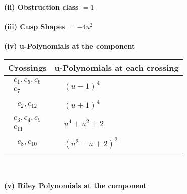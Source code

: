 \documentclass[1p]{elsarticle_modified}
\theoremstyle{definition}
\begin{document}
\flushleft \textbf{(ii) Obstruction class $= 1$}\\~\\
\flushleft \textbf{(iii) Cusp Shapes $= -4 u^2$}\\~\\
\newpage\renewcommand{\arraystretch}{1}
\flushleft \textbf{(iv) u-Polynomials at the component}\newline \\
\begin{tabular}{m{50pt}|m{274pt}}
Crossings & \hspace{64pt}u-Polynomials at each crossing \\
\hline $$\begin{aligned}c_{1},c_{5},c_{6}\\c_{7}\end{aligned}$$&$\begin{aligned}
&(u-1)^4
\end{aligned}$\\
\hline $$\begin{aligned}c_{2},c_{12}\end{aligned}$$&$\begin{aligned}
&(u+1)^4
\end{aligned}$\\
\hline $$\begin{aligned}c_{3},c_{4},c_{9}\\c_{11}\end{aligned}$$&$\begin{aligned}
&u^4+u^2+2
\end{aligned}$\\
\hline $$\begin{aligned}c_{8},c_{10}\end{aligned}$$&$\begin{aligned}
&(u^2- u+2)^2
\end{aligned}$\\
\hline
\end{tabular}\\~\\
\newpage\renewcommand{\arraystretch}{1}
\flushleft \textbf{(v) Riley Polynomials at the component}\newline \\
\end{document}
